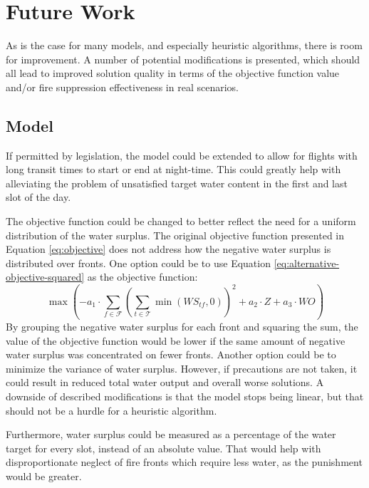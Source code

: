 \chapter{Future Work}

As is the case for many models, and especially heuristic algorithms, there is room for improvement.
A number of potential modifications is presented, which should all lead to improved solution quality in terms of the objective function value and/or fire suppression effectiveness in real scenarios.


\section{Model}

If permitted by legislation, the model could be extended to allow for flights with long transit times to start or end at night-time.
This could greatly help with alleviating the problem of unsatisfied target water content in the first and last slot of the day.

The objective function could be changed to better reflect the need for a uniform distribution of the water surplus.
The original objective function presented in Equation \ref{eq:objective} does not address how the negative water surplus is distributed over fronts.
One option could be to use Equation \ref{eq:alternative-objective-squared} as the objective function:
\begin{equation}\label{eq:alternative-objective-squared}
\max \left( - a_1 \cdot \sum_{f \in \mathcal{F}} \left( \sum_{t \in \mathcal{T}} \min ( \mathit{WS}_{tf}, 0 ) \right) ^ 2
    + a_2 \cdot Z
    + a_3 \cdot \mathit{WO} \right)
\end{equation}
By grouping the negative water surplus for each front and squaring the sum, the value of the objective function would be lower if the same amount of negative water surplus was concentrated on fewer fronts.
Another option could be to minimize the variance of water surplus.
However, if precautions are not taken, it could result in reduced total water output and overall worse solutions.
A downside of described modifications is that the model stops being linear, but that should not be a hurdle for a heuristic algorithm.

Furthermore, water surplus could be measured as a percentage of the water target for every slot, instead of an absolute value.
That would help with disproportionate neglect of fire fronts which require less water, as the punishment would be greater.

